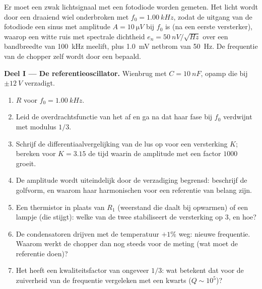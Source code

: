 \begin{problem}
\label{pb:b2:feedback-oscillators:1}

Er moet een zwak lichtsignaal met een fotodiode worden gemeten. Het licht
wordt door een draaiend wiel onderbroken met $f_0 = \qty{1.00}{kHz}$, zodat
de uitgang van de fotodiode een sinus met amplitude $A = \qty{10}{\micro V}$
bij $f_0$ is (na een eerste versterker), waarop een witte ruis met spectrale
dichtheid $e_n = \qty{50}{nV/\sqrt{Hz}}$ over een bandbreedte van
\qty{100}{kHz} meelift, plus \qty{1.0}{mV} netbrom van \qty{50}{Hz}. De
frequentie van de chopper zelf wordt door een  bepaald.

\medskip
\noindent\textbf{Deel I --- De referentieoscillator.}
Wienbrug met $C = \qty{10}{nF}$, opamp die bij $\pm\qty{12}{V}$ verzadigt.
\begin{enumerate}
  \item $R$ voor $f_0 = \qty{1.00}{kHz}$.
  \item Leid de overdrachtsfunctie van het  af en ga na dat haar
        fase bij $f_0$ verdwijnt met modulus $1/3$.
  \item Schrijf de differentiaalvergelijking van de lus op voor een
        versterking $K$; bereken voor $K = 3.15$ de tijd waarin de amplitude
        met een factor $1000$ groeit.
  \item De amplitude wordt uiteindelijk door de verzadiging begrensd:
        beschrijf de golfvorm, en waarom haar harmonischen voor een
        referentie van belang zijn.
  \item Een thermistor in plaats van $R_1$ (weerstand die daalt bij
        opwarmen) of een lampje (die stijgt): welke van de twee stabiliseert
        de versterking op 3, en hoe?
  \item De condensatoren drijven met de temperatuur $+1\%$ weg: nieuwe
        frequentie. Waarom werkt de chopper dan nog steeds voor de meting
        (wat moet de referentie doen)?
  \item Het  heeft een kwaliteitsfactor van ongeveer $1/3$: wat
        betekent dat voor de zuiverheid van de frequentie vergeleken met een
        kwarts ($Q \sim 10^5$)?
\end{enumerate}


\end{problem}
